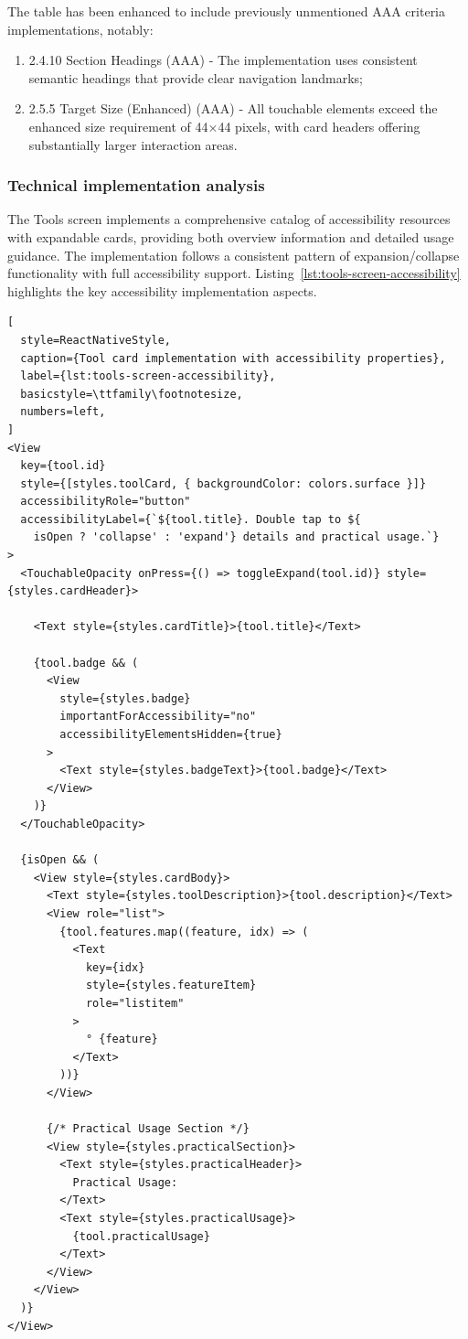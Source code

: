 The table has been enhanced to include previously unmentioned AAA criteria implementations, notably:

\begin{enumerate}
    \item 2.4.10 Section Headings (AAA) - The implementation uses consistent semantic headings that provide clear navigation landmarks;
    
    \item 2.5.5 Target Size (Enhanced) (AAA) - All touchable elements exceed the enhanced size requirement of 44×44 pixels, with card headers offering substantially larger interaction areas.
\end{enumerate}

\subsubsection{Technical implementation analysis}

The Tools screen implements a comprehensive catalog of accessibility resources with expandable cards, providing both overview information and detailed usage guidance. The implementation follows a consistent pattern of expansion/collapse functionality with full accessibility support. Listing~\ref{lst:tools-screen-accessibility} highlights the key accessibility implementation aspects.

\begin{lstlisting}[
  style=ReactNativeStyle,
  caption={Tool card implementation with accessibility properties},
  label={lst:tools-screen-accessibility},
  basicstyle=\ttfamily\footnotesize,
  numbers=left,
]
<View
  key={tool.id}
  style={[styles.toolCard, { backgroundColor: colors.surface }]}
  accessibilityRole="button"
  accessibilityLabel={`${tool.title}. Double tap to ${
    isOpen ? 'collapse' : 'expand'} details and practical usage.`}
>
  <TouchableOpacity onPress={() => toggleExpand(tool.id)} style={styles.cardHeader}>
    
    <Text style={styles.cardTitle}>{tool.title}</Text>
    
    {tool.badge && (
      <View 
        style={styles.badge} 
        importantForAccessibility="no" 
        accessibilityElementsHidden={true}
      >
        <Text style={styles.badgeText}>{tool.badge}</Text>
      </View>
    )}
  </TouchableOpacity>

  {isOpen && (
    <View style={styles.cardBody}>
      <Text style={styles.toolDescription}>{tool.description}</Text>
      <View role="list">
        {tool.features.map((feature, idx) => (
          <Text 
            key={idx} 
            style={styles.featureItem} 
            role="listitem"
          >
            ° {feature}
          </Text>
        ))}
      </View>
      
      {/* Practical Usage Section */}
      <View style={styles.practicalSection}>
        <Text style={styles.practicalHeader}>
          Practical Usage:
        </Text>
        <Text style={styles.practicalUsage}>
          {tool.practicalUsage}
        </Text>
      </View>
    </View>
  )}
</View>
\end{lstlisting}
\FloatBarrier

